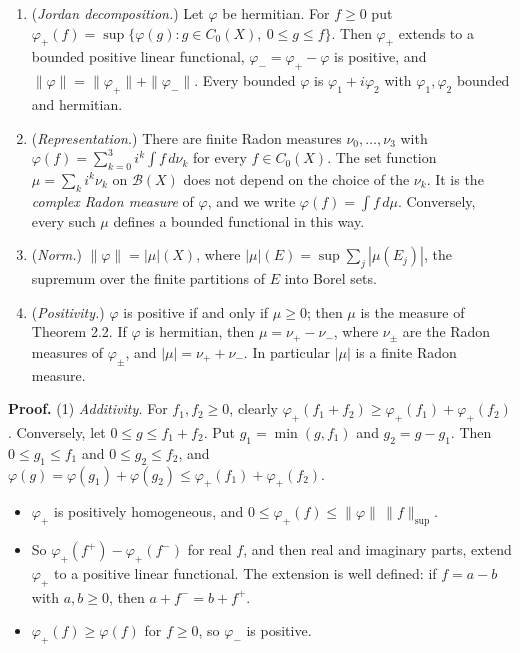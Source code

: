 \documentclass[
  english,
  11pt,
  a4paper,
]{article}
\providecommand{\tightlist}{%
  \setlength{\itemsep}{0pt}\setlength{\parskip}{0pt}}
\begin{document}
\begin{enumerate}
\tightlist
\item
  (\emph{Jordan decomposition.}) Let \(\varphi\) be hermitian. For
  \(f\geq0\) put
  \(\varphi_+(f)=\sup\{\varphi(g):g\in C_0(X),\ 0\leq g\leq f\}\). Then
  \(\varphi_+\) extends to a bounded positive linear functional,
  \(\varphi_-=\varphi_+-\varphi\) is positive, and
  \(\|\varphi\|=\|\varphi_+\|+\|\varphi_-\|\). Every bounded \(\varphi\)
  is \(\varphi_1+i\varphi_2\) with \(\varphi_1,\varphi_2\) bounded and
  hermitian.
\item
  (\emph{Representation.}) There are finite Radon measures
  \(\nu_0,\dots,\nu_3\) with
  \(\varphi(f)=\sum_{k=0}^3i^k\int f\,d\nu_k\) for every
  \(f\in C_0(X)\). The set function \(\mu=\sum_ki^k\nu_k\) on
  \(\mathcal B(X)\) does not depend on the choice of the \(\nu_k\). It
  is the \emph{complex Radon measure} of \(\varphi\), and we write
  \(\varphi(f)=\int f\,d\mu\). Conversely, every such \(\mu\) defines a
  bounded functional in this way.
\item
  (\emph{Norm.}) \(\|\varphi\|=|\mu|(X)\), where
  \(|\mu|(E)=\sup\sum_j|\mu(E_j)|\), the supremum over the finite
  partitions of \(E\) into Borel sets.
\item
  (\emph{Positivity.}) \(\varphi\) is positive if and only if
  \(\mu\geq0\); then \(\mu\) is the measure of Theorem 2.2. If
  \(\varphi\) is hermitian, then \(\mu=\nu_+-\nu_-\), where \(\nu_\pm\)
  are the Radon measures of \(\varphi_\pm\), and \(|\mu|=\nu_++\nu_-\).
  In particular \(|\mu|\) is a finite Radon measure.
\end{enumerate}

\textbf{Proof.} (1) \emph{Additivity.} For \(f_1,f_2\geq0\), clearly
\(\varphi_+(f_1+f_2)\geq\varphi_+(f_1)+\varphi_+(f_2)\). Conversely, let
\(0\leq g\leq f_1+f_2\). Put \(g_1=\min(g,f_1)\) and \(g_2=g-g_1\). Then
\(0\leq g_1\leq f_1\) and \(0\leq g_2\leq f_2\), and
\(\varphi(g)=\varphi(g_1)+\varphi(g_2)\leq\varphi_+(f_1)+\varphi_+(f_2)\).

\begin{itemize}
\tightlist
\item
  \(\varphi_+\) is positively homogeneous, and
  \(0\leq\varphi_+(f)\leq\|\varphi\|\,\|f\|_{\sup}\).
\item
  So \(\varphi_+(f^+)-\varphi_+(f^-)\) for real \(f\), and then real and
  imaginary parts, extend \(\varphi_+\) to a positive linear functional.
  The extension is well defined: if \(f=a-b\) with \(a,b\geq0\), then
  \(a+f^-=b+f^+\).
\item
  \(\varphi_+(f)\geq\varphi(f)\) for \(f\geq0\), so \(\varphi_-\) is
  positive.
\end{itemize}
\end{document}
